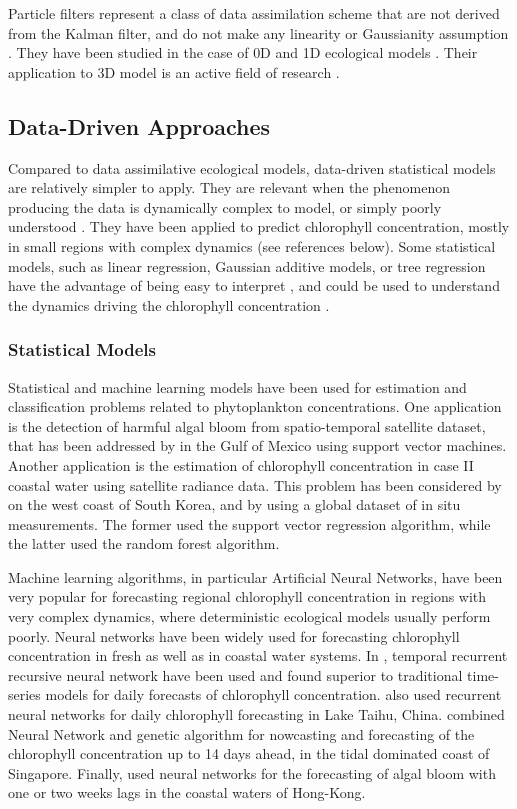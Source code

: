 Particle filters represent a class of data assimilation scheme that are not
derived from the Kalman filter, and do not make any linearity or Gaussianity
assumption \citep{Edwards2015}. They have been studied in the case of 0D and 1D
ecological models \citep{Edwards2015}.  Their application to 3D model is an
active field of research \citep{Edwards2015}.


\subsection{Data-Driven Approaches}

Compared to data assimilative ecological models, data-driven statistical models
are relatively simpler to apply. They are relevant when the phenomenon
producing the data is dynamically complex to model, or simply poorly understood
\citep{Gareth2013}. They have been applied to predict chlorophyll
concentration, mostly in small regions with complex dynamics (see references
below). Some statistical models, such as linear regression, Gaussian additive
models, or tree regression have the advantage of being easy to interpret
\citep{Gareth2013}, and could be used to understand the dynamics driving the
chlorophyll concentration \citep{Raitsos2012}.

\subsubsection{Statistical Models}

Statistical and machine learning models have been used for estimation and
classification problems related to phytoplankton concentrations. One
application is the detection of harmful algal bloom from spatio-temporal
satellite dataset, that has been addressed by \citet{Gokaraju2011} in the Gulf
of Mexico using support vector machines. Another application is the estimation
of chlorophyll concentration in case II coastal water using satellite radiance
data. This problem has been considered by \citet{Kim2014} on the west coast of
South Korea, and by \citet{Camps-Valls2006} using a global dataset of in situ
measurements.  The former used the support vector regression algorithm, while
the latter used the random forest algorithm.

Machine learning algorithms, in particular Artificial Neural Networks, have
been very popular for forecasting regional chlorophyll concentration in regions
with very complex dynamics, where deterministic ecological models usually
perform poorly.  Neural networks have been widely used for forecasting
chlorophyll concentration in fresh as well as in coastal water systems. In
\citet{Jeong2006}, temporal recurrent recursive neural network have been used
and found superior to traditional time-series models for daily forecasts of
chlorophyll concentration.  \citet{Wang2013} also used recurrent neural
networks for daily chlorophyll forecasting in Lake Taihu, China.
\citet{Mulia2013} combined Neural Network and genetic algorithm for nowcasting
and forecasting of the chlorophyll concentration up to 14 days ahead, in the
tidal dominated coast of Singapore.  Finally, \citet{Lee2013} used neural
networks for the forecasting of algal bloom with one or two weeks lags in the
coastal waters of Hong-Kong.

